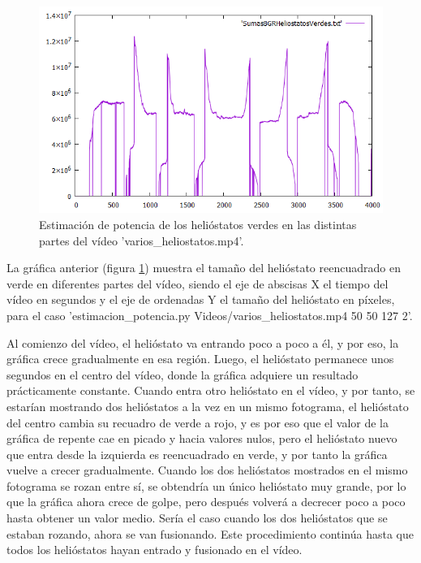\begin{figure}[h!]
  	\centering
	\includegraphics[width=\textwidth]{ValidacionCualitativaFuncionEstimacionPotencia/SumasBGRHeliostatosVerdesVideo1.png}
	\caption{Estimación de potencia de los helióstatos verdes en las distintas partes del vídeo 'varios\_heliostatos.mp4'.
	\label{fig:ValidacionCualitativaFuncionEstimacionPotencia/SumasBGRHeliostatosVerdesVideo1.png}}
\end{figure}

La gráfica anterior (figura \ref{fig:ValidacionCualitativaFuncionEstimacionPotencia/SumasBGRHeliostatosVerdesVideo1.png}) muestra el tamaño del helióstato reencuadrado en verde en diferentes partes del vídeo, siendo el eje de abscisas X el tiempo del vídeo en segundos y el eje de ordenadas Y el tamaño del helióstato en píxeles, para el caso 'estimacion\_potencia.py Videos/varios\_heliostatos.mp4 50 50 127 2'.

Al comienzo del vídeo, el helióstato va entrando poco a poco a él, y por eso, la gráfica crece gradualmente en esa región. Luego, el helióstato permanece unos segundos en el centro del vídeo, donde la gráfica adquiere un resultado prácticamente constante. Cuando entra otro helióstato en el vídeo, y por tanto, se estarían mostrando dos helióstatos a la vez en un mismo fotograma, el helióstato del centro cambia su recuadro de verde a rojo, y es por eso que el valor de la gráfica de repente cae en picado y hacia valores nulos, pero el helióstato nuevo que entra desde la izquierda es reencuadrado en verde, y por tanto la gráfica vuelve a crecer gradualmente. Cuando los dos helióstatos mostrados en el mismo fotograma se rozan entre sí, se obtendría un único helióstato muy grande, por lo que la gráfica ahora crece de golpe, pero después volverá a decrecer poco a poco hasta obtener un valor medio. Sería el caso cuando los dos helióstatos que se estaban rozando, ahora se van fusionando. Este procedimiento continúa hasta que todos los helióstatos hayan entrado y fusionado en el vídeo.

